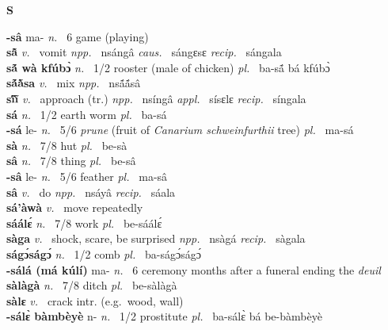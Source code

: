 \medskip
\noindent \large {\bfseries S}\normalsize\\
\medskip

\noindent 
{\bfseries -sâ} ma- {\itshape n.~} 6 game (playing)    \\ 
{\bfseries sã̂}  {\itshape v.~} vomit   {\itshape npp.~} nsángâ {\itshape caus.~} sángɛsɛ {\itshape recip.~} sángala  \\ 
{\bfseries sã́ wà kfúbɔ̀}  {\itshape n.~} 1/2 rooster (male of chicken) {\itshape pl.~} ba-sã́ bá kfúbɔ̀    \\ 
{\bfseries sã́ã̀sa}  {\itshape v.~} mix   {\itshape npp.~} nsã́ã́sâ  \\ 
{\bfseries sĩ́ĩ̀}  {\itshape v.~} approach (tr.)   {\itshape npp.~} nsíngâ {\itshape appl.~} sísɛlɛ {\itshape recip.~} síngala  \\ 
{\bfseries sá}   {\itshape n.~} 1/2 earth worm {\itshape pl.~} ba-sá    \\ 
{\bfseries -sá} le- {\itshape n.~} 5/6 {\itshape prune} (fruit of {\itshape Canarium schweinfurthii} tree) {\itshape pl.~} ma-sá    \\ 
{\bfseries sà}  {\itshape n.~} 7/8 hut {\itshape pl.~} be-sà    \\ 
{\bfseries sâ}  {\itshape n.~} 7/8 thing {\itshape pl.~} be-sâ    \\ 
{\bfseries -sâ} le- {\itshape n.~} 5/6 feather {\itshape pl.~} ma-sâ    \\ 
{\bfseries sâ}  {\itshape v.~} do   {\itshape npp.~} nsáyâ {\itshape recip.~} sáala  \\ 
{\bfseries sá'àwà}  {\itshape v.~} move repeatedly    \\ 
{\bfseries sáálɛ́}  {\itshape n.~} 7/8 work {\itshape pl.~} be-sáálɛ́    \\ 
{\bfseries sàga}  {\itshape v.~} shock, scare, be surprised   {\itshape npp.~} nsàgá {\itshape recip.~} sàgala  \\ 
{\bfseries ságɔ́ságɔ́}  {\itshape n.~} 1/2 comb {\itshape pl.~} ba-ságɔ́ságɔ́    \\ 
{\bfseries -sálá (má kúlí)} ma- {\itshape n.~} 6 ceremony months after a funeral ending the {\itshape deuil}    \\ 
{\bfseries sàlàgà}  {\itshape n.~} 7/8 ditch {\itshape pl.~} be-sàlàgà    \\ 
{\bfseries sàlɛ}  {\itshape v.~} crack  intr. (e.g.\ wood, wall)    \\ 
{\bfseries -sálɛ̀ bàmbèyè} n- {\itshape n.~} 1/2 prostitute {\itshape pl.~} ba-sálɛ̀ bá be-bàmbèyè    \\ 
